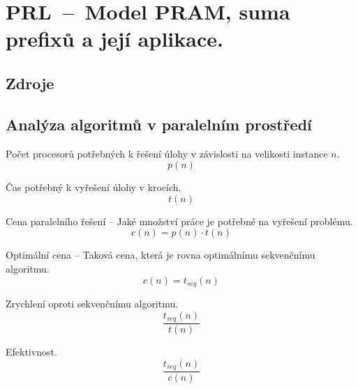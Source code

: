 

\graphicspath{{prl/model_pram/figures}}


\chapter{PRL~--~Model PRAM, suma prefixů a její aplikace.}


\section{Zdroje}

\begin{compactitem}
    \item {}
\end{compactitem}


\section{Analýza algoritmů v paralelním prostředí}

\begin{compactitem}
    \item Počet procesorů potřebných k řešení úlohy v závislosti na velikosti instance $n$.
    $$ p(n) $$

    \item Čas potřebný k vyřešení úlohy v krocích.
    $$ t(n) $$

    \item Cena paralelního řešení -- Jaké množství práce je potřebné na vyřešení problému.
    $$ c(n) = p(n) \cdot t(n) $$

    \item Optimální cena -- Taková cena, která je rovna optimálnímu sekvenčnímu algoritmu.
    $$ c(n) = t_{seq}(n) $$

    \item Zrychlení oproti sekvenčnímu algoritmu.
    $$ \displaystyle{ \frac{ t_{seq}(n) }{ t(n) } } $$

    \item Efektivnost.
    $$ \displaystyle{ \frac{ t_{seq}(n) }{ c(n) } } $$
\end{compactitem}

